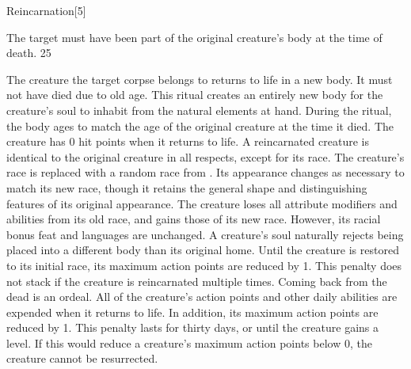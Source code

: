 \begin{spellsection}{Reincarnation}[5]
\begin{spellcontent}
\begin{spelltargetinginfo}
\spellspecial The target must have been part of the original creature's body at the time of death.
 25
\end{spelltargetinginfo}
\begin{spelleffects}
\spelleffect
The creature the target corpse belongs to returns to life in a new body.
It must not have died due to old age.
This ritual creates an entirely new body for the creature's soul to inhabit from the natural elements at hand.
During the ritual, the body ages to match the age of the original creature at the time it died.
The creature has 0 hit points when it returns to life.
A reincarnated creature is identical to the original creature in all respects, except for its race.
The creature's race is replaced with a random race from .
Its appearance changes as necessary to match its new race, though it retains the general shape and distinguishing features of its original appearance.
The creature loses all attribute modifiers and abilities from its old race, and gains those of its new race.
However, its racial bonus feat and languages are unchanged.
A creature's soul naturally rejects being placed into a different body than its original home.
Until the creature is restored to its initial race, its maximum action points are reduced by 1.
This penalty does not stack if the creature is reincarnated multiple times.
Coming back from the dead is an ordeal.
All of the creature's action points and other daily abilities are expended when it returns to life.
In addition, its maximum action points are reduced by 1.
This penalty lasts for thirty days, or until the creature gains a level.
If this would reduce a creature's maximum action points below 0, the creature cannot be resurrected.
\end{spelleffects}
\end{spellcontent}
\begin{spellfooter}
\end{spellfooter}
\begin{spellsubcontent}
\end{spellsubcontent}
\end{spellsection}
